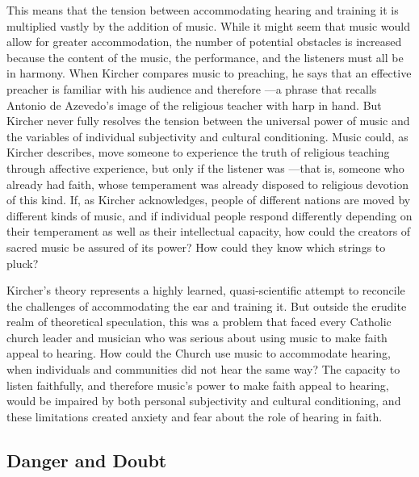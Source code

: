 This means that the tension between accommodating hearing and training it is
multiplied vastly by the addition of music.
While it might seem that music would allow for greater accommodation, the number
of potential obstacles is increased because the content of the music, the
performance, and the listeners must all be in harmony.
When Kircher compares music to preaching, he says that an effective preacher is
familiar with his audience and therefore ---a phrase that recalls Antonio de Azevedo's image of the religious
teacher with harp in hand.%
    \Autocite
    [551: .]
    {Kircher:Musurgia}
But Kircher never fully resolves the tension between the universal power of
music and the variables of individual subjectivity and cultural conditioning.
Music could, as Kircher describes, move someone to experience the truth of
religious teaching through affective experience, but only if the listener was
---that is, someone who already
had faith, whose temperament was already disposed to religious devotion of this
kind.
If, as Kircher acknowledges, people of different nations are moved by different
kinds of music, and if individual people respond differently depending on their
temperament as well as their intellectual capacity, how could the creators of
sacred music be assured of its power?
How could they know which strings to pluck?

Kircher's theory represents a highly learned, quasi-scientific attempt to
reconcile the challenges of accommodating the ear and training it.
But outside the erudite realm of theoretical speculation, this was a problem
that faced every Catholic church leader and musician who was serious about using
music to make faith appeal to hearing.
How could the Church use music to accommodate hearing, when individuals and
communities did not hear the same way?
The capacity to listen faithfully, and therefore music's power to make faith
appeal to hearing, would be impaired by both personal subjectivity and cultural
conditioning, and these limitations created anxiety and fear about the role of
hearing in faith.

\subsection{Danger and Doubt}

